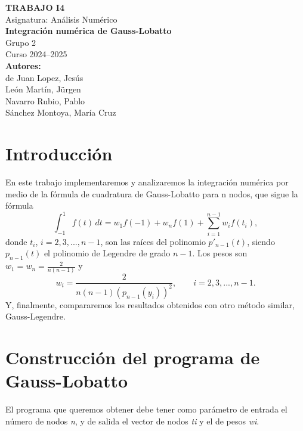 \documentclass[a4paper]{article}
\begin{document}
\begin{titlepage}
    \begin{center}
        \vspace*{2cm}
        
        \Large
        \textbf{TRABAJO I4} \\[0.5cm]
        \large
        Asignatura: Análisis Numérico \\[2cm]
        
        {\fontsize{40}{48}\selectfont
        \textbf{Integración numérica de Gauss-Lobatto}} \\[3cm]
        
        \Large
        Grupo 2 \\[0.5cm]
        Curso 2024--2025 \\[3cm]
        
        \textbf{Autores:} \\[0.5cm]
        de Juan Lopez, Jesús \\
        León Martín, Jürgen \\
        Navarro Rubio, Pablo \\
        Sánchez Montoya, María Cruz \\[4cm]
        
    \end{center}
\end{titlepage}

\tableofcontents

\newpage


\section{Introducción}
En este trabajo implementaremos y analizaremos la integración numérica por medio de la fórmula de cuadratura de Gauss-Lobatto para n nodos, que sigue la fórmula
\[
\int_{-1}^{1} \! f(t)  \,dt = w_1 f(-1) + w_n f(1) + \sum_{i=1}^{n-1}w_i f(t_i),
\]
donde $t_i$, $i=2, 3,...,n-1$, son las raíces del polinomio $p'_{n-1}(t)$, siendo $p_{n-1}(t)$ el polinomio de Legendre de grado $n-1$. Los pesos son $w_1 = w_n = \tfrac{2}{n(n-1)}$ y
\[
w_i=\frac{2}{n(n-1)(p_{n-1}(y_i))^2},\qquad i=2,3,...,n-1.
\]
Y, finalmente, compararemos los resultados obtenidos con otro método similar, Gauss-Legendre.


\section{Construcción del programa de Gauss-Lobatto}
El programa que queremos obtener debe tener como parámetro de entrada el número de nodos \textit{n}, y de salida el vector de nodos \textit{ti} y el de pesos \textit{wi}.
\end{document}
